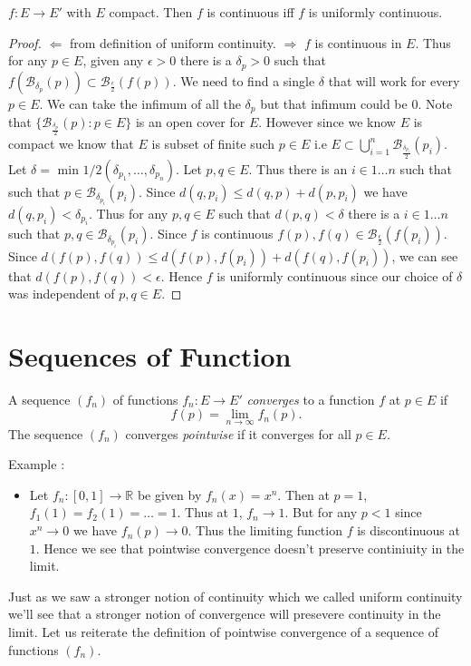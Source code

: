 \begin{Theorem}[name=Uniform continuity and continuity]
    $f : E \to E'$ with $E$ compact. Then $f$ is continuous iff $f$ is uniformly continuous.
\end{Theorem}
\begin{proof}
    $\Leftarrow$ from definition of uniform continuity.
    $\Rightarrow$ $f$ is continuous in $E$. Thus for any $p \in E$, given any $\epsilon > 0$ there
    is a $\delta_ p > 0$ such that $f\left(\mathcal{B}_{\delta _p}(p)\right) \subset
    \mathcal{B}_{\frac{\epsilon}{2}}\left(f(p)\right)$. We need to find a single $\delta$ that will work
    for every $p \in E$. We can take the infimum of all the $\delta _p$ but that infimum could be $0$.
    Note that $\left.\lbrace\mathcal{B}_{\frac{\delta _{p}}{2}}(p) : p \in E\rbrace\right.$ is an 
    open cover for $E$.
    However since we know $E$ is compact we know that $E$ is subset of finite such $p \in E$ i.e 
    $E \subset \bigcup_{i= 1}^n
    \mathcal{B}_{\frac{\delta_{p_i}}{2}}(p_i)$. Let $\delta = \text{ min }1/2(\delta _{p_1},\dots,
    \delta _{p_n})$. Let $p,q \in E$. Thus there is an $i \in 1 \dots n$ such that such that $p \in  \mathcal{B}_{\delta _{p_i}}
    (p_i)$. Since $d(q,p_i) \leq d(q,p) + d(p,p_i)$ we have $d(q,p_i) < \delta _{p_i}$. Thus for 
    any $p,q \in E$ such that $d(p,q) < \delta$ there is a $i \in 1 \dots n$ such that 
    $p,q \in \mathcal{B}_{\delta _{p_i}}(p_i)$. Since $f$ is continuous $f(p),f(q) \in 
    \mathcal{B}_{\frac{\epsilon}{2}}\left(f(p_i)\right)$. Since $d(f(p),f(q)) \leq d(f(p),f(p_i)) +
    d(f(q),f(p_i))$, we can see that  $d(f(p),f(q)) < \epsilon$. Hence $f$ is uniformly continuous 
    since our choice of $\delta$ was independent of $p,q \in E$.
\end{proof}

\section{Sequences of Function}
\begin{Definition} A sequence $\left(f_n\right)$ of functions $f_n : E \to E'$ \emph{converges} to
    a function $f$ at $p \in E$ if \[ f(p) = \lim_{n \to \infty} f_n(p). \] The sequence 
    $\left(f_n\right)$ converges \emph{pointwise} if it converges for all $p \in E$.
\end{Definition}
Example :
\begin{itemize}
    \item Let $f_n : \left[0 , 1 \right] \to \mathbb{R}$ be given by $f_n(x) = x^n$. Then at $p =
	1$, $f_1(1) = f_2(1) = \dots = 1$. Thus at $1$, $f_n \to 1$. But for any $p < 1$ since $x^n
	\to 0$ we have $f_n(p) \to 0$. Thus the limiting function $f$ is discontinuous at $1$. Hence
	we see that pointwise convergence doesn't preserve continiuity in the limit.
\end{itemize}
Just as we saw a stronger notion of continuity which we called uniform continuity we'll see that a
stronger notion of convergence will presevere continuity in the limit. Let us reiterate the definition
of pointwise convergence of a sequence of functions $\left(f_n\right)$. 

